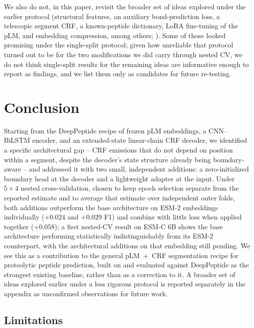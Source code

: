 \documentclass{article}
\begin{document}
We also do not, in this paper, revisit the broader set of ideas explored under the earlier protocol (structural features, an auxiliary bond-prediction loss, a telescopic segment CRF, a known-peptide dictionary, LoRA fine-tuning of the pLM, and embedding compression, among others; ). Some of those looked promising under the single-split protocol; given how unreliable that protocol turned out to be for the two modifications we did carry through nested CV, we do not think single-split results for the remaining ideas are informative enough to report as findings, and we list them only as candidates for future re-testing.

\section{Conclusion}
\label{sec:conclusion}

Starting from the DeepPeptide recipe of frozen pLM embeddings, a CNN--BiLSTM encoder, and an extended-state linear-chain CRF decoder, we identified a specific architectural gap -- CRF emissions that do not depend on position within a segment, despite the decoder's state structure already being boundary-aware -- and addressed it with two small, independent additions: a zero-initialized boundary head at the decoder and a lightweight adapter at the input. Under $5\times4$ nested cross-validation, chosen to keep epoch selection separate from the reported estimate and to average that estimate over independent outer folds, both additions outperform the base architecture on ESM-2 embeddings individually ($+0.024$ and $+0.029$ F1) and combine with little loss when applied together ($+0.058$); a first nested-CV result on ESM-C 6B shows the base architecture performing statistically indistinguishably from its ESM-2 counterpart, with the architectural additions on that embedding still pending. We see this as a contribution to the general pLM~+~CRF segmentation recipe for proteolytic peptide prediction, built on and evaluated against DeepPeptide as the strongest existing baseline, rather than as a correction to it. A broader set of ideas explored earlier under a less rigorous protocol is reported separately in the appendix as unconfirmed observations for future work.

\subsection{Limitations}
\label{sec:limitations}
\end{document}
